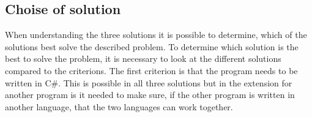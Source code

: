 \subsection{Choise of solution}
When understanding the three solutions it is possible to determine, which of the solutions best solve the described problem. To determine which solution is the best to solve the problem, it is necessary to look at the different solutions compared to the criterions. The first criterion is that the program needs to be written in C#. This is possible in all three solutions but in the extension for another program is it needed to make sure, if the other program is written in another language, that the two languages can work together.